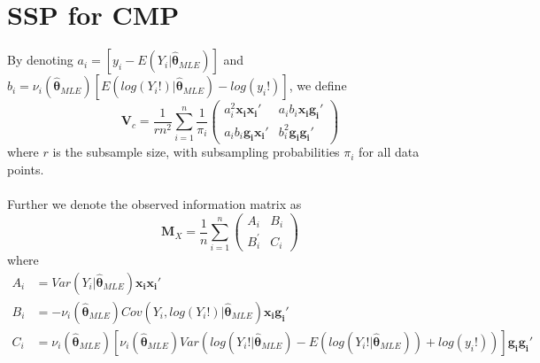 \documentclass[]{article}
\begin{document}
\section{SSP for CMP}
By denoting $a_i = [y_i - E(Y_i| \hat{\boldsymbol{\theta}}_{MLE})]$ and $b_i = 	\nu_i(\hat{\boldsymbol{\theta}}_{MLE})[E(log(Y_i!)| \hat{\boldsymbol{\theta}}_{MLE}) - log(y_i!)]$, we define 
$$\boldsymbol{V}_c = \frac{1}{rn^2}\sum_{i=1}^{n}\frac{1}{\pi_i}\begin{pmatrix}
	a_i^2\boldsymbol{x_i}\boldsymbol{x_i}' &
	a_i b_i\boldsymbol{x_i}\boldsymbol{g_i}'\\
	a_i b_i\boldsymbol{g_i}\boldsymbol{x_i}' &
	b_i^2\boldsymbol{g_i}\boldsymbol{g_i}'
\end{pmatrix}$$
where $r$ is the subsample size, with subsampling probabilities $\pi_i$ for all data points.\\
\\
Further we denote the observed information matrix as
$$
\boldsymbol{M}_X = \frac{1}{n}\sum_{i=1}^{n}\begin{pmatrix}
	A_i & B_i\\
	B_i^{'} & C_i
\end{pmatrix}
$$
where
\begin{align*}
	A_i &= Var(Y_i|\hat{\boldsymbol{\theta}}_{MLE})\boldsymbol{x_i}\boldsymbol{x_i}'\\
	B_i &= -\nu_i(\hat{\boldsymbol{\theta}}_{MLE}) Cov(Y_i, log(Y_i!)| \hat{\boldsymbol{\theta}}_{MLE})\boldsymbol{x_i}\boldsymbol{g_i}'\\
	C_i &= \nu_i(\hat{\boldsymbol{\theta}}_{MLE})[\nu_i(\hat{\boldsymbol{\theta}}_{MLE}) Var(log(Y_i!|\hat{\boldsymbol{\theta}}_{MLE}) - E(log(Y_i!|\hat{\boldsymbol{\theta}}_{MLE})) + log(y_i!))]\boldsymbol{g_i}\boldsymbol{g_i}'
\end{align*}
\end{document}
